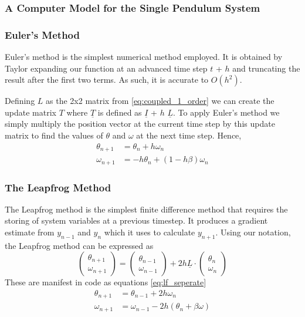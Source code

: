 \documentclass[11pt]{article}
\begin{document}
\subsubsection*{A Computer Model for the Single Pendulum System}
\subsubsection*{Euler's Method}
Euler's method is the simplest numerical method employed. It is obtained by Taylor expanding our function at an advanced time step $t$ + $h$ and truncating the result after the first two terms. As such, it is accurate to $O(h^2)$. 

Defining \underline{$L$} as the 2x2 matrix from \ref{eq:coupled_1_order} we can create the update matrix \underline{$T$} where $\underline{T}$ is defined as $\underline{I}$ + $h$ $\underline{L}$. To apply Euler's method we simply multiply the position vector at the current time step by this update matrix to find the values of $\theta$ and $\omega$ at the next time step. Hence,
\begin{equation} \label{eq:euler_seperate}
\begin{split}
\theta_{n+1} &= \theta_{n} + h\omega_{n} \\
\omega_{n+1} &= -h\theta_{n} + (1 -h \beta)\omega_{n}
\end{split}
\end{equation}

\subsubsection*{The Leapfrog Method}
The Leapfrog method is the simplest finite difference method that requires the storing of system variables at a previous timestep. It produces a gradient estimate from $y_{n-1}$ and $y_{n}$ which it uses to calculate $y_{n+1}$.  Using our notation, the Leapfrog method can be expressed as
\begin{equation} \label{eq:lf_vector}
\begin{pmatrix}\theta_{n+1} \\ \omega_{n+1} \end{pmatrix} = \begin{pmatrix}\theta_{n-1} \\ \omega_{n-1} \end{pmatrix} + 2 h \underline{L} \cdot \begin{pmatrix}\theta_{n} \\ \omega_{n} \end{pmatrix}
\end{equation}
These are manifest in code as equations \ref{eq:lf_seperate}
\begin{equation} \label{eq:lf_seperate}
\begin{split}
\theta_{n+1} &= \theta_{n-1} + 2h\omega_{n} \\
\omega_{n+1} &= \omega_{n-1} - 2h( \theta_{n} + \beta \omega )
\end{split}
\end{equation}
\end{document}
